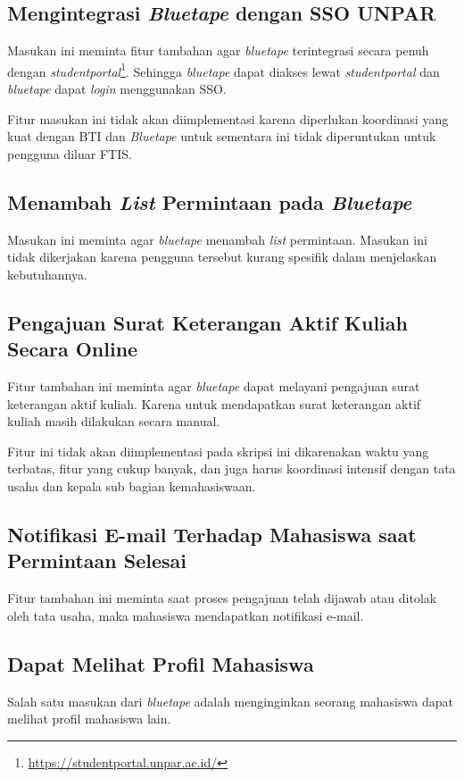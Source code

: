 \subsection{Mengintegrasi \textit{Bluetape} dengan SSO UNPAR}
Masukan ini meminta fitur tambahan agar \textit{bluetape} terintegrasi secara penuh dengan \textit{studentportal}\footnote{\url{https://studentportal.unpar.ac.id/}}. Sehingga \textit{bluetape} dapat diakses lewat \textit{studentportal} dan \textit{bluetape} dapat \textit{login} menggunakan SSO.

Fitur masukan ini tidak akan diimplementasi karena diperlukan koordinasi yang kuat dengan BTI dan \textit{Bluetape} untuk sementara ini tidak diperuntukan untuk pengguna diluar FTIS.

\subsection{Menambah \textit{List} Permintaan pada \textit{Bluetape}}
Masukan ini meminta agar \textit{bluetape} menambah \textit{list} permintaan. Masukan ini tidak dikerjakan karena pengguna tersebut kurang spesifik dalam menjelaskan kebutuhannya.

\subsection{Pengajuan Surat Keterangan Aktif Kuliah Secara Online}

Fitur tambahan ini meminta agar \textit{bluetape} dapat melayani pengajuan surat keterangan aktif kuliah. Karena untuk mendapatkan surat keterangan aktif kuliah masih dilakukan secara manual.

Fitur ini tidak akan diimplementasi pada skripsi ini dikarenakan waktu yang terbatas, fitur yang cukup banyak, dan juga harus koordinasi intensif dengan tata usaha dan kepala sub bagian kemahasiswaan.

\subsection{Notifikasi E-mail Terhadap Mahasiswa saat Permintaan Selesai}
Fitur tambahan ini meminta saat proses pengajuan telah dijawab atau ditolak oleh tata usaha, maka mahasiswa mendapatkan notifikasi e-mail.
 

\subsection{Dapat Melihat Profil Mahasiswa}
Salah satu masukan dari \textit{bluetape} adalah menginginkan seorang mahasiswa dapat melihat profil mahasiswa lain.


